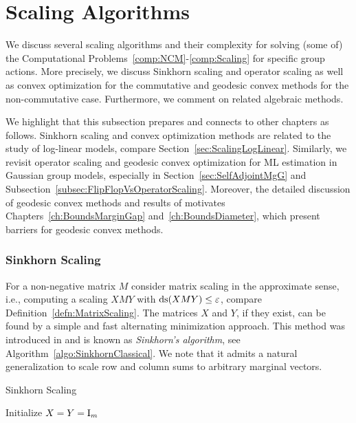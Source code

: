 \section{Scaling Algorithms} \label{sec:ScalingAlgorithms}

We discuss several scaling algorithms and their complexity for solving (some of) the Computational Problems~\ref{comp:NCM}-\ref{comp:Scaling} for specific group actions. More precisely, we discuss Sinkhorn scaling and  operator scaling as well as convex optimization for the commutative and geodesic convex methods for the non-commutative case. Furthermore, we comment on related algebraic methods.

We highlight that this subsection prepares and connects to other chapters as follows. Sinkhorn scaling and convex optimization methods are related to the study of log-linear models, compare Section~\ref{sec:ScalingLogLinear}. Similarly, we revisit operator scaling and geodesic convex optimization for ML estimation in Gaussian group models, especially in Section~\ref{sec:SelfAdjointMgG} and Subsection~\ref{subsec:FlipFlopVsOperatorScaling}. Moreover, the detailed discussion of geodesic convex methods and results of \cite{GradflowArXiv} motivates Chapters~\ref{ch:BoundsMarginGap} and~\ref{ch:BoundsDiameter}, which present barriers for geodesic convex methods.

\subsubsection*{Sinkhorn Scaling}

For a non-negative matrix $M$ consider matrix scaling in the approximate sense, i.e., computing a scaling $XMY$ with $\operatorname{ds}(XMY) \leq \varepsilon$, compare Definition~\ref{defn:MatrixScaling}.
The matrices $X$ and $Y$, if they exist, can be found by a simple and fast alternating minimization approach. This method was introduced in  \cite{sinkhornClassical1964} and is known as \emph{Sinkhorn's algorithm}, see Algorithm~\ref{algo:SinkhornClassical}. We note that it admits a natural generalization \cite{sinkhorn1967concerning} to scale row and column sums to arbitrary marginal vectors.


\begin{algorithm}[h]
	\caption{Sinkhorn Scaling} \label{algo:SinkhornClassical}
	\SetAlgoLined
	\BlankLine
	Initialize $X=Y=\operatorname{I}_m$\;
\end{algorithm}

